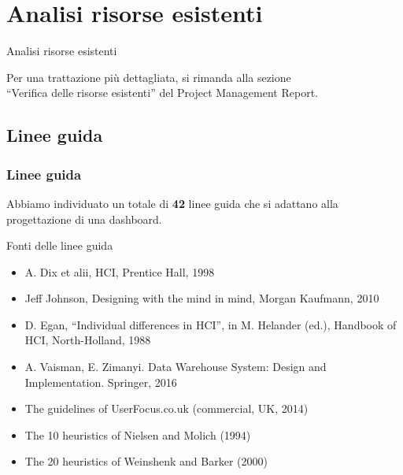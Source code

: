 \documentclass[handout]{beamer}
\begin{document}
	\section{Analisi risorse esistenti}
		\begin{frame}
			\centering
			\begin{Huge}
				Analisi risorse esistenti
			\end{Huge}
			\mbox{}
			\vfill
			\vspace*{100px}
			\begin{scriptsize}
				Per una trattazione più dettagliata, si rimanda alla sezione\\``Verifica delle risorse esistenti'' del Project Management Report.
			\end{scriptsize}
		\end{frame}

		\subsection{Linee guida}

			\begin{frame}
	 			\frametitle{Linee guida}
				Abbiamo individuato un totale di \textbf{42} linee guida che si adattano alla progettazione di una dashboard.
				\begin{block}{Fonti delle linee guida}
					\begin{itemize}[<+->]
						\item A. Dix et alii, HCI, Prentice Hall, 1998\\
						\item Jeff Johnson, Designing with the mind in mind, Morgan Kaufmann, 2010\\
						\item D. Egan, “Individual differences in HCI”, in M. Helander (ed.), Handbook of HCI, North-Holland, 1988\\
						\item A. Vaisman, E. Zimanyi. Data Warehouse System: Design and Implementation. Springer, 2016\\
						\item The guidelines of UserFocus.co.uk (commercial, UK, 2014)\\
						\item The 10 heuristics of Nielsen and Molich (1994)\\
						\item The 20 heuristics of Weinshenk and Barker (2000)\\
					\end{itemize}
				\end{block}
			\end{frame}
		
\end{document}
